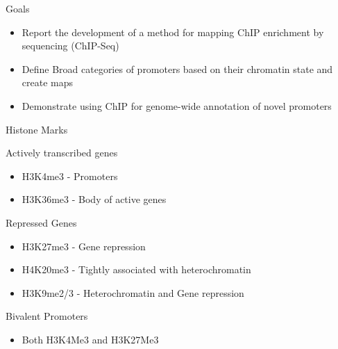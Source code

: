 \documentclass[bigger]{beamer}
\begin{document}
\begin{frame}[label={sec:org8f4a699}]{Goals}
\begin{itemize}
\item Report the development of a method for mapping ChIP enrichment by sequencing
(ChIP-Seq)
\item Define Broad categories of promoters based on their chromatin state and create maps
\item Demonstrate using ChIP for genome-wide annotation of novel promoters
\end{itemize}
\end{frame}

\begin{frame}[label={sec:org22d436b}]{Histone Marks}
\begin{block}{Actively transcribed genes}
\begin{itemize}
\item H3K4me3 - Promoters
\item H3K36me3 - Body of active genes
\end{itemize}
\end{block}

\begin{block}{Repressed Genes}
\begin{itemize}
\item H3K27me3 - Gene repression
\item H4K20me3 - Tightly associated with heterochromatin
\item H3K9me2/3 - Heterochromatin and Gene repression
\end{itemize}
\end{block}

\begin{block}{Bivalent Promoters}
\begin{itemize}
\item Both H3K4Me3 and H3K27Me3
\end{itemize}
\end{block}
\end{frame}
\end{document}
